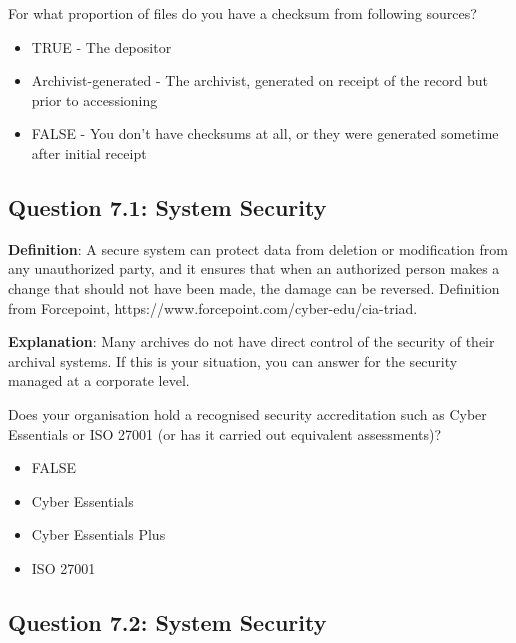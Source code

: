 \documentclass[a4paper,oneside]{article}
\providecommand{\tightlist}{%
    \setlength{\itemsep}{2pt}\setlength{\parskip}{0pt}}
\begin{document}
\begin{landscape}
For what proportion of files do you have a checksum from following sources?

\begin{itemize}
\tightlist
\item
  TRUE - The depositor\\
\item
  Archivist-generated - The archivist, generated on receipt of the record but prior to accessioning\\
\item
  FALSE - You don't have checksums at all, or they were generated sometime after initial receipt
\end{itemize}

\newpage

\hypertarget{question-7.1-system-security}{%
\subsection{Question 7.1: System Security}\label{question-7.1-system-security}}

\textbf{Definition}: A secure system can protect data from deletion or modification from any unauthorized party, and it ensures that when an authorized person makes a change that should not have been made, the damage can be reversed. Definition from Forcepoint, https://www.forcepoint.com/cyber-edu/cia-triad.

\textbf{Explanation}: Many archives do not have direct control of the security of their archival systems. If this is your situation, you can answer for the security managed at a corporate level.

Does your organisation hold a recognised security accreditation such as Cyber Essentials or ISO 27001 (or has it carried out equivalent assessments)?

\begin{itemize}
\tightlist
\item
  FALSE\\
\item
  Cyber Essentials\\
\item
  Cyber Essentials Plus\\
\item
  ISO 27001
\end{itemize}

\newpage

\hypertarget{question-7.2-system-security}{%
\subsection{Question 7.2: System Security}\label{question-7.2-system-security}}


\end{landscape}
\end{document}
